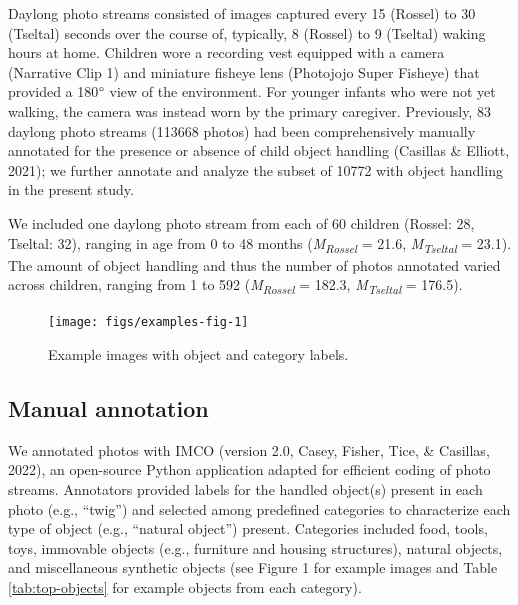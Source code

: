 \documentclass[10pt, letterpaper]{article}
\newenvironment{CodeChunk}{}{}
\begin{document}
Daylong photo streams consisted of images captured every 15 (Rossel) to
30 (Tseltal) seconds over the course of, typically, 8 (Rossel) to 9
(Tseltal) waking hours at home. Children wore a recording vest equipped
with a camera (Narrative Clip 1) and miniature fisheye lens (Photojojo
Super Fisheye) that provided a 180\(\text{\textdegree}\) view of the
environment. For younger infants who were not yet walking, the camera
was instead worn by the primary caregiver. Previously, 83 daylong photo
streams (113668 photos) had been comprehensively manually annotated for
the presence or absence of child object handling (Casillas \& Elliott,
2021); we further annotate and analyze the subset of 10772 with object
handling in the present study.

We included one daylong photo stream from each of 60 children (Rossel:
28, Tseltal: 32), ranging in age from 0 to 48 months
(\emph{M}\textsubscript{\emph{Rossel}} = 21.6,
\emph{M}\textsubscript{\emph{Tseltal}} = 23.1). The amount of object
handling and thus the number of photos annotated varied across children,
ranging from 1 to 592 (\emph{M}\textsubscript{\emph{Rossel}} = 182.3,
\emph{M}\textsubscript{\emph{Tseltal}} = 176.5).

\begin{CodeChunk}
\begin{figure}[h]

{\centering \texttt{[image: figs/examples-fig-1]} 

}

\caption[Example images with object and category labels]{Example images with object and category labels.}\label{fig:examples-fig}
\end{figure}
\end{CodeChunk}

\hypertarget{manual-annotation}{%
\subsection{Manual annotation}\label{manual-annotation}}

We annotated photos with IMCO (version 2.0, Casey, Fisher, Tice, \&
Casillas, 2022), an open-source Python application adapted for efficient
coding of photo streams. Annotators provided labels for the handled
object(s) present in each photo (e.g., ``twig'') and selected among
predefined categories to characterize each type of object (e.g.,
``natural object'') present. Categories included food, tools, toys,
immovable objects (e.g., furniture and housing structures), natural
objects, and miscellaneous synthetic objects (see Figure 1 for example
images and Table \ref{tab:top-objects} for example objects from each
category).
\end{document}
